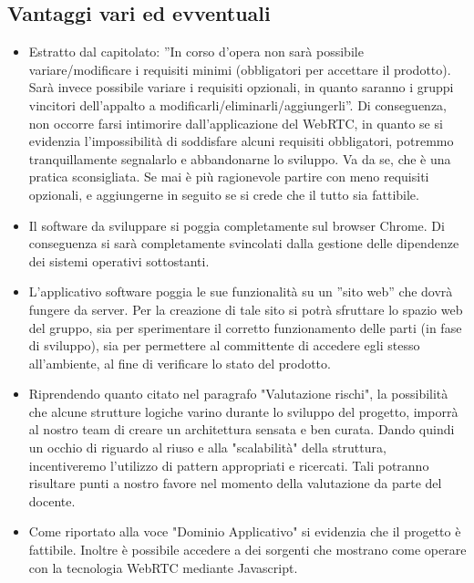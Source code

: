 \subsection{Vantaggi vari ed evventuali}
\begin{itemize}
	\item Estratto dal capitolato: ''In corso d'opera non sarà possibile variare/modificare i requisiti minimi (obbligatori per accettare il prodotto). Sarà invece possibile variare i requisiti opzionali, in quanto saranno i gruppi vincitori dell'appalto a modificarli/eliminarli/aggiungerli''. Di conseguenza, non occorre farsi intimorire dall'applicazione del WebRTC, in quanto se si evidenzia l'impossibilità di soddisfare alcuni requisiti obbligatori, potremmo tranquillamente segnalarlo e abbandonarne lo sviluppo. Va da se, che è una pratica sconsigliata. Se mai è più ragionevole partire con meno requisiti opzionali, e aggiungerne in seguito se si crede che il tutto sia fattibile.
	\item Il software da sviluppare si poggia completamente sul browser Chrome. Di conseguenza si sarà completamente svincolati dalla gestione delle dipendenze dei sistemi operativi sottostanti.
	\item L'applicativo software poggia le sue funzionalità su un ''sito web'' che dovrà fungere da server. Per la creazione di tale sito si potrà sfruttare lo spazio web del gruppo, sia per sperimentare il corretto funzionamento delle parti (in fase di sviluppo), sia per permettere al committente di accedere egli stesso all'ambiente, al fine di verificare lo stato del prodotto.
	\item Riprendendo quanto citato nel paragrafo  "Valutazione rischi", la possibilità che alcune strutture logiche varino durante lo sviluppo del progetto, imporrà al nostro team di creare un architettura sensata e ben curata. Dando quindi un occhio di riguardo al riuso e alla "scalabilità" della struttura, incentiveremo l'utilizzo di pattern appropriati e ricercati. Tali potranno risultare punti a nostro favore nel momento della valutazione da parte del docente.
	\item Come riportato alla voce "Dominio Applicativo" si evidenzia che il progetto è fattibile. Inoltre è possibile accedere a dei sorgenti che mostrano come operare con la tecnologia WebRTC mediante Javascript.
\end{itemize}
